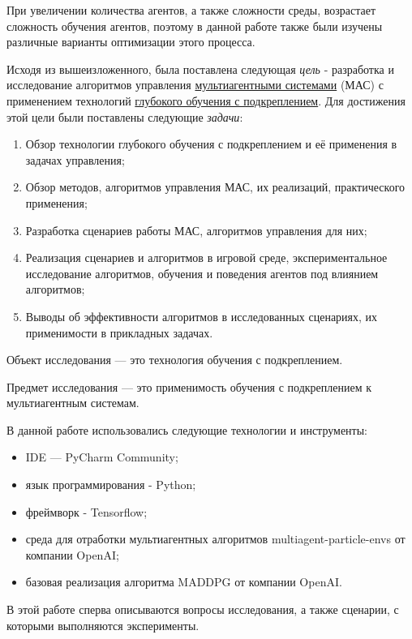 При увеличении количества агентов, а также сложности среды, возрастает сложность обучения агентов, поэтому в данной работе также были изучены различные варианты оптимизации этого процесса.

Исходя из вышеизложенного, была поставлена следующая \textit{цель} - разработка и исследование алгоритмов управления \hyperref[acr:rl]{мультиагентными системами} (МАС) с применением технологий \hyperref[acr:drl]{глубокого обучения с подкреплением}. Для достижения этой цели были поставлены следующие \textit{задачи}:

\begin{enumerate}
	\item Обзор технологии глубокого обучения с подкреплением и её применения в задачах управления;
	\item Обзор методов, алгоритмов управления МАС, их реализаций, практического применения;
	\item Разработка сценариев работы МАС, алгоритмов управления для них;
	\item Реализация сценариев и алгоритмов в игровой среде, экспериментальное исследование алгоритмов, обучения и поведения агентов под влиянием алгоритмов;
	\item Выводы об эффективности алгоритмов в исследованных сценариях, их применимости в прикладных задачах. 
\end{enumerate}

Объект исследования --- это технология обучения с подкреплением.

Предмет исследования --- это применимость обучения с подкреплением к мультиагентным системам.

В данной работе использовались следующие технологии и инструменты:

\begin{itemize}
	\item IDE --- PyCharm Community;
	\item язык программирования - Python;
	\item фреймворк - Tensorflow;
	\item среда для отработки мультиагентных алгоритмов multiagent-particle-envs \cite{multiagent-particle-envs} от компании OpenAI;
	\item базовая реализация алгоритма MADDPG \cite{lowe2017multiagent} от компании OpenAI.
\end{itemize}

В этой работе сперва описываются вопросы исследования, а также сценарии, с которыми выполняются эксперименты.

